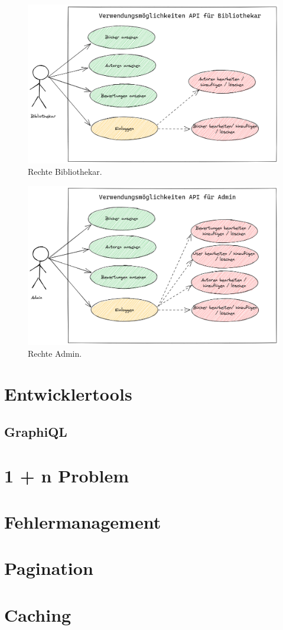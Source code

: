 \begin{figure}[H]
    \includegraphics[width=\textwidth]{pics/UseCaseLibrarian.png}
    \caption{Rechte Bibliothekar.}
\end{figure}

\begin{figure}[H]
    \includegraphics[width=\textwidth]{pics/UseCaseAdmin.png}
    \caption{Rechte Admin.}
\end{figure}

\section{Entwicklertools}
\subsection{GraphiQL}
\section{1 + n Problem}
\section{Fehlermanagement}
\section{Pagination}
\section{Caching}

